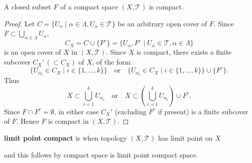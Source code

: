 \documentclass{article}
\begin{document}
\begin{proposition}
A closed subset $F$ of a compact space $(X, \mathcal{T})$ is compact.
\end{proposition}

\begin{proof}
Let $C = \{U_\alpha \mid \alpha \in \Lambda, U_\alpha \in \mathcal{T}\}$ be an arbitrary open cover of $F$. Since $F \subset \bigcup_{\alpha \in \Lambda} U_\alpha$,
\[
C_X = C \cup \{F^c\} = \{U_\alpha, F^c \mid U_\alpha \in \mathcal{T}, \alpha \in \Lambda\}
\]
is an open cover of $X$ in $(X, \mathcal{T})$. Since $X$ is compact, there exists a finite subcover $C_X' \, (\subset C_X)$ of $X$, of the form
\[
\{U_{\alpha_i} \in C_X \mid i \in \{1, \dots, k\}\} \quad \text{or} \quad \{U_{\alpha_i} \in C_X \mid i \in \{1, \dots, k\}\} \cup \{F^c\}.
\]
Thus
\[
X \subset \bigcup_{i=1}^k U_{\alpha_i} \quad \text{or} \quad X \subset \left(\bigcup_{i=1}^k U_{\alpha_i}\right) \cup F^c.
\]
Since $F \cap F^c = \emptyset$, in either case $C_X'$ (excluding $F^c$ if present) is a finite subcover of $F$. Hence $F$ is compact in $(X, \mathcal{T})$.
\end{proof}

\textbf{limit point compact} is when topology $(X,\mathcal{T})$ has limit point on $X$

and this follows by compact space is limit point compact space. 
\end{document}

